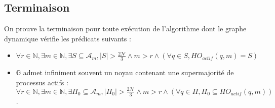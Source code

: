 \documentclass{article}
\begin{document}
\subsection{Terminaison}

On prouve la terminaison pour toute exécution de l'algorithme dont le graphe dynamique vérifie les prédicats suivants :
\begin{itemize}
	\item $\forall r \in \mathds{N}, \exists m \in \mathds{N}, \exists S \subseteq \mathcal{A}_m, |S| > \frac{2\mathcal{N}}{3} \wedge m > r \wedge (\forall q \in S, HO_{actif}(q, m) = S)$
	\item $\mathds{G}$ admet infiniment souvent un noyau contenant une supermajorité de processus actifs :
		$\forall r \in \mathds{N}, \exists m \in \mathds{N}, \exists \Pi_0 \subseteq \mathcal{A}_m, |\Pi_0| > \frac{2\mathcal{N}}{3} \wedge m > r \wedge (\forall q \in \Pi, \Pi_0 \subseteq HO_{actif}(q,m))$.
\end{itemize}
\end{document}
